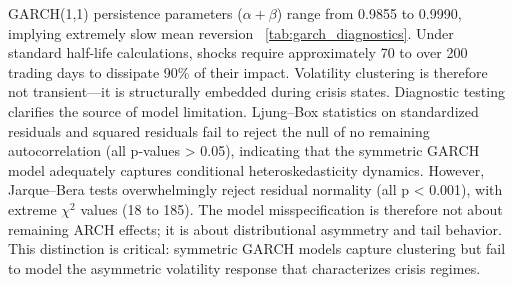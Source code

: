 \documentclass{article}
\begin{document}
GARCH(1,1) persistence parameters ($\alpha + \beta$) range from 0.9855 to 0.9990, implying extremely slow mean reversion ~\ref{tab:garch_diagnostics}. Under standard half-life calculations, shocks require approximately 70 to over 200 trading days to dissipate 90\% of their impact. Volatility clustering is therefore not transient—it is structurally embedded during crisis states. Diagnostic testing clarifies the source of model limitation. Ljung–Box statistics on standardized residuals and squared residuals fail to reject the null of no remaining autocorrelation (all p-values > 0.05), indicating that the symmetric GARCH model adequately captures conditional heteroskedasticity dynamics. However, Jarque–Bera tests overwhelmingly reject residual normality (all p < 0.001), with extreme $\chi^2$ values (18 to 185). The model misspecification is therefore not about remaining ARCH effects; it is about distributional asymmetry and tail behavior. This distinction is critical: symmetric GARCH models capture clustering but fail to model the asymmetric volatility response that characterizes crisis regimes.\newline
\end{document}
